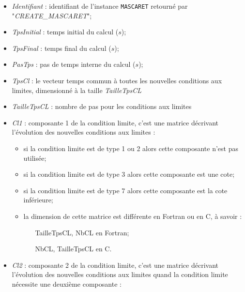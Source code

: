 \documentclass[a4paper,11pt]{article}
\begin{document}
 \begin{itemize}
 
    \item \textit{Identifiant} : identifiant de l'instance \texttt{MASCARET} retourn\'e par "\textit{CREATE\_MASCARET}";
    \vspace{0.5cm}
    \item \textit{TpsInitial} : temps initial du calcul ($s$);
    \vspace{0.5cm}
    \item \textit{TpsFinal} : temps final du calcul ($s$);
    \vspace{0.5cm}
    \item \textit{PasTps} : pas de temps interne du calcul ($s$);
    \vspace{0.5cm}
    \item \textit{TpsCl} : le vecteur temps commun \`a toutes les nouvelles conditions aux limites, dimensionn\'e \`a la taille \textit{TailleTpsCL}
    \vspace{0.5cm}
    \item \textit{TailleTpsCL} : nombre de pas pour les conditions aux limites
    \vspace{0.5cm}
    \item \textit{Cl1} : composante 1 de la condition limite, c'est une matrice d\'ecrivant l'\'evolution des nouvelles conditions aux limites :
       \begin{itemize}
          \item si la condition limite est de type 1 ou 2 alors cette composante n'est pas utilis\'ee;
          \item si la condition limite est de type 3 alors cette composante est une cote;
          \item si la condition limite est de type 7 alors cette composante est la cote inf\'erieure;
          \item la dimension de cette matrice est diff\'erente en Fortran ou en C, \`a savoir :
             \begin{itemize}
                \item [TailleTpsCL, NbCL] en Fortran;
                \item [NbCL, TailleTpsCL] en C.
             \end{itemize}
       \end{itemize}
    \vspace{0.5cm}
    \item \textit{Cl2} : composante 2 de la condition limite, c'est une matrice d\'ecrivant l'\'evolution des nouvelles conditions aux limites quand la condition limite n\'ecessite une deuxi\`eme composante :

\end{itemize}
\end{document}
